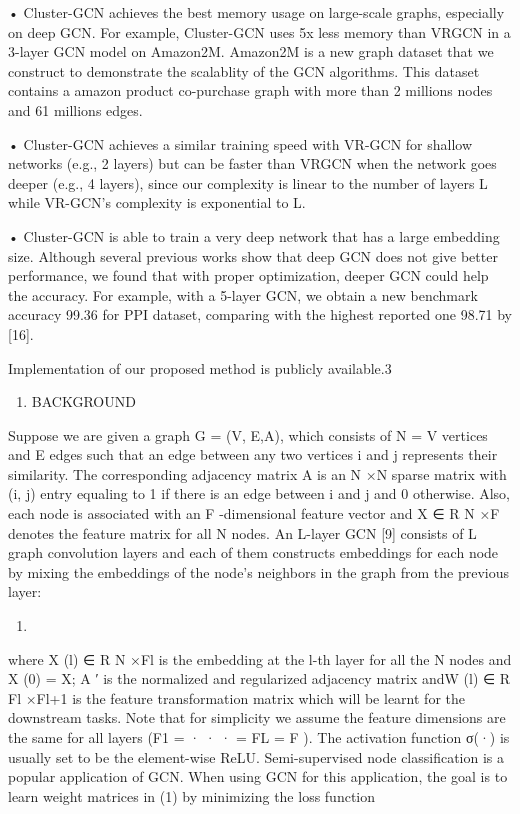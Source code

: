 \documentclass[
]{book}
\providecommand{\tightlist}{%
  \setlength{\itemsep}{0pt}\setlength{\parskip}{0pt}}
\begin{document}
{{{• Cluster-GCN achieves the best memory usage on large-scale graphs, especially on deep GCN. For example, Cluster-GCN uses 5x less memory than VRGCN in a 3-layer GCN model on Amazon2M. Amazon2M is a new graph dataset that we construct to demonstrate the scalablity of the GCN algorithms. This dataset contains a amazon product co-purchase graph with more than 2 millions nodes and 61 millions edges.

• Cluster-GCN achieves a similar training speed with VR-GCN for shallow networks (e.g., 2 layers) but can be faster than VRGCN when the network goes deeper (e.g., 4 layers), since our complexity is linear to the number of layers L while VR-GCN's complexity is exponential to L.

• Cluster-GCN is able to train a very deep network that has a large embedding size. Although several previous works show that deep GCN does not give better performance, we found that with proper optimization, deeper GCN could help the accuracy. For example, with a 5-layer GCN, we obtain a new benchmark accuracy 99.36 for PPI dataset, comparing with the highest reported one 98.71 by {[}16{]}.

Implementation of our proposed method is publicly available.3

\begin{enumerate}
\def\labelenumi{\arabic{enumi}.}
\setcounter{enumi}{1}
\tightlist
\item
  BACKGROUND
\end{enumerate}

Suppose we are given a graph G = (V, E,A), which consists of N = \textbar V \textbar{} vertices and \textbar E \textbar{} edges such that an edge between any two vertices i and j represents their similarity. The corresponding adjacency matrix A is an N ×N sparse matrix with (i, j) entry equaling to 1 if there is an edge between i and j and 0 otherwise. Also, each node is associated with an F -dimensional feature vector and X ∈ R N ×F denotes the feature matrix for all N nodes. An L-layer GCN {[}9{]} consists of L graph convolution layers and each of them constructs embeddings for each node by mixing the embeddings of the node's neighbors in the graph from the previous layer:

\begin{enumerate}
\def\labelenumi{(\arabic{enumi})}
\tightlist
\item
\end{enumerate}

where X (l) ∈ R N ×Fl is the embedding at the l-th layer for all the N nodes and X (0) = X; A ′ is the normalized and regularized adjacency matrix andW (l) ∈ R Fl ×Fl+1 is the feature transformation matrix which will be learnt for the downstream tasks. Note that for simplicity we assume the feature dimensions are the same for all layers (F1 = · · · = FL = F ). The activation function σ(·) is usually set to be the element-wise ReLU. Semi-supervised node classification is a popular application of GCN. When using GCN for this application, the goal is to learn weight matrices in (1) by minimizing the loss function

}}}
\end{document}
